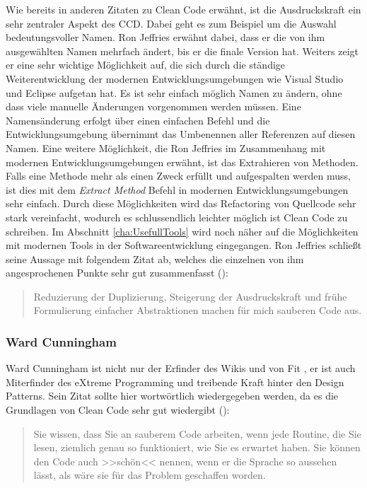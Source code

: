 Wie bereits in anderen Zitaten zu Clean Code erwähnt, ist die Ausdruckskraft ein sehr zentraler Aspekt des CCD. Dabei geht es zum Beispiel um die Auswahl bedeutungsvoller Namen. Ron Jeffries erwähnt dabei, dass er die von ihm ausgewählten Namen mehrfach ändert, bis er die finale Version hat. Weiters zeigt er eine sehr wichtige Möglichkeit auf, die sich durch die ständige Weiterentwicklung der modernen Entwicklungsumgebungen wie Visual Studio und Eclipse aufgetan hat. Es ist sehr einfach möglich Namen zu ändern, ohne dass viele manuelle Änderungen vorgenommen werden müssen. Eine Namensänderung erfolgt über einen einfachen Befehl und die Entwicklungsumgebung übernimmt das Umbenennen aller Referenzen auf diesen Namen. Eine weitere Möglichkeit, die Ron Jeffries im Zusammenhang mit modernen Entwicklungsumgebungen erwähnt, ist das Extrahieren von Methoden. Falls eine Methode mehr als einen Zweck erfüllt und aufgespalten werden muss, ist dies mit dem \textit{Extract Method} Befehl in modernen Entwicklungsumgebungen sehr einfach. Durch diese Möglichkeiten wird das Refactoring von Quellcode sehr stark vereinfacht, wodurch es schlussendlich leichter möglich ist Clean Code zu schreiben. Im Abschnitt \ref{cha:UsefullTools} wird noch näher auf die Möglichkeiten mit modernen Tools in der Softwareentwicklung eingegangen. Ron Jeffries schließt seine Aussage mit folgendem Zitat ab, welches die einzelnen von ihm angesprochenen Punkte sehr gut zusammenfasst (\cite[Seite 38]{Martin2008}):

\begin{quotation}
Reduzierung der Duplizierung, Steigerung der Ausdruckskraft und frühe Formulierung einfacher Abstraktionen machen für mich sauberen Code aus.
\end{quotation}

\subsubsection{Ward Cunningham}
Ward Cunningham ist nicht nur der Erfinder des Wikis \cite{Wiki2016} und von Fit \cite{Fit2016}, er ist auch Miterfinder des eXtreme Programming \cite{Beck2005} und treibende Kraft hinter den Design Patterns. Sein Zitat sollte hier wortwörtlich wiedergegeben werden, da es die Grundlagen von Clean Code sehr gut wiedergibt (\cite[Seite 39]{Martin2008}):

\begin{quotation}
	Sie wissen, dass Sie an sauberem Code arbeiten, wenn jede Routine, die Sie lesen, ziemlich genau so funktioniert, wie Sie es erwartet haben. Sie können den Code auch >>schön<< nennen, wenn er die Sprache so aussehen lässt, als wäre sie für das Problem geschaffen worden.
\end{quotation}

